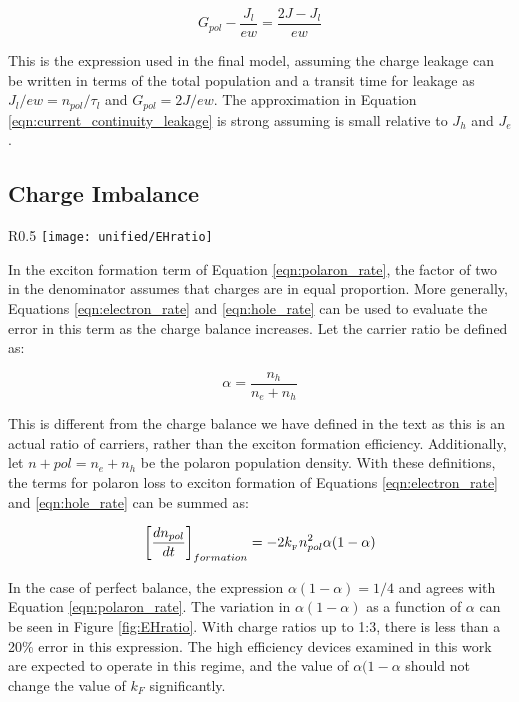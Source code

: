 \documentclass[../thesis.tex]{subfiles}
\begin{document}
\begin{equation}
G_{pol}-\frac{J_l}{ew}=\frac{2J-J_l}{ew}
\label{polaron_generation}
\end{equation}

This is the expression used in the final model, assuming the charge leakage can be written in terms of the total population and a transit time for leakage as  $J_l/ew=n_{pol}/\tau_l$ and $G_{pol}=2J/ew$.  
The approximation in Equation \ref{eqn:current_continuity_leakage} is strong assuming  is small relative to  $J_h$ and $J_e$.

\subsection{Charge Imbalance} \label{sec:charge_imbalance}

\begin{wrapfigure}[14]{R}{0.5\textwidth}
\centering
\texttt{[image: unified/EHratio]}
\caption{The quantity $\alpha(1-\alpha)$ is plotted as a function of the polaron composition, $\alpha$ and the electron to hole ratio.}
\label{fig:EHratio}
\end{wrapfigure}

In the exciton formation term of Equation \ref{eqn:polaron_rate}, the factor of two in the denominator assumes that charges are in equal proportion.  
More generally, Equations \ref{eqn:electron_rate} and \ref{eqn:hole_rate} can be used to evaluate the error in this term as the charge balance increases.  
Let the carrier ratio be defined as:

\begin{equation}
\alpha=\frac{n_h}{n_e+n_h}
\label{eqn:charge_ratio}
\end{equation}

This is different from the charge balance we have defined in the text as this is an actual ratio of carriers, rather than the exciton formation efficiency.  
Additionally, let  $n+{pol}=n_e+n_h$ be the polaron population density.  
With these definitions, the terms for polaron loss to exciton formation of Equations \ref{eqn:electron_rate} and \ref{eqn:hole_rate} can be summed as:

\begin{equation}
\left[\frac{dn_{pol}}{dt}\right]_{formation}=-2k_{_\text{\tiny F}} n_{pol}^2\alpha(1-\alpha)
\label{eqn:exciton_formation_charge_ratio}
\end{equation}

In the case of perfect balance, the expression  $\alpha(1-\alpha)=1/4$ and agrees with Equation \ref{eqn:polaron_rate}.  
The variation in $\alpha(1-\alpha)$ as a function of $\alpha$  can be seen in Figure \ref{fig:EHratio}.  
With charge ratios up to 1:3, there is less than a 20\% error in this expression.  
The high efficiency devices examined in this work are expected to operate in this regime, and the value of  $\alpha(1-\alpha$ should not change the value of  $k_F$ significantly.
\end{document}
